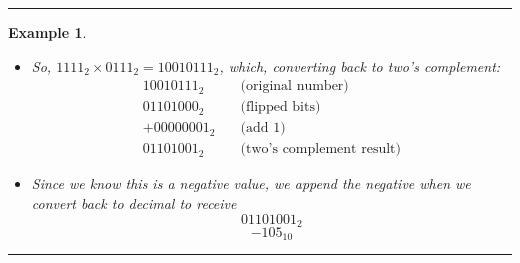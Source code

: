 \documentclass[12pt]{article}
\newtheorem{example}{Example}
\newenvironment{examp}
{\vspace{0.5cm}
 \hrule
\vspace{0.5cm}
\begin{example}}
{\hrule
\vspace{0.5cm}
\end{example}}
\begin{document}
\begin{examp}
\begin{itemize}
		\item So, \(1111_2 \times 0111_2 = 10010111_2\), which, converting back to two's complement:
		      \[
			      \begin{aligned}
				      10010111_2   & \quad \text{(original number)}         \\
				      \hline
				      01101000_2   & \quad \text{(flipped bits)}            \\
				      + 00000001_2 & \quad \text{(add 1)}                   \\
				      \hline
				      01101001_2   & \quad \text{(two's complement result)}
			      \end{aligned}
		      \]
		\item Since we know this is a negative value, we append the negative when we convert back to decimal to receive
		      \[
			      01101001_2
		      \]
		      \[
			      -105_{10}
		      \]
	\end{itemize}
\end{examp}
\end{document}
